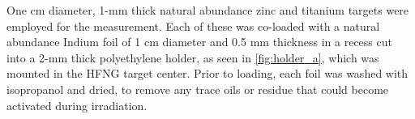 
One cm diameter, 1-mm thick natural abundance zinc and titanium targets were employed for the measurement.
Each of these was  co-loaded with a natural abundance Indium foil of 1 cm diameter and 0.5 mm thickness in a recess cut into a 2-mm thick polyethylene holder, as seen in \autoref{fig:holder_a}, which was mounted in the HFNG target center.
Prior to loading, each foil was washed with isopropanol and dried, to remove any trace oils or residue that could become activated during irradiation.






